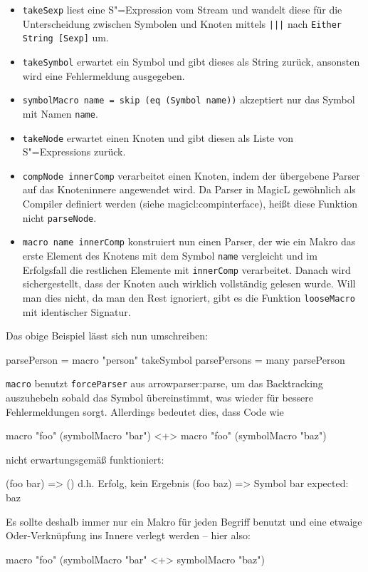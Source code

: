 \documentclass[12pt, a4paper, bibgerm]{scrbook}
\newenvironment{DIFnomarkup}{}{}
\newcommand\icode[1]{\lstinline?#1?}
\newcommand\sref{}
\newcommand{\sexp}{S"=Expression}
\newcommand{\sexps}{S"=Expressions}
\begin{document}
\begin{itemize}
\item \icode{takeSexp} liest eine \sexp{} vom Stream und wandelt diese
  für die Unterscheidung zwischen Symbolen und Knoten mittels
  \icode{|||} nach \icode{Either String [Sexp]} um.
\item \icode{takeSymbol} erwartet ein Symbol und gibt dieses als String
  zurück, ansonsten wird eine Fehlermeldung ausgegeben.
\item \icode{symbolMacro name = skip (eq (Symbol name))} akzeptiert nur
  das Symbol mit Namen \icode{name}.
\item \icode{takeNode} erwartet einen Knoten und gibt diesen als Liste
  von \sexps{} zurück.
\item \icode{compNode innerComp} verarbeitet einen Knoten, indem der
  übergebene Parser auf das Knoteninnere angewendet
  wird. Da Parser in MagicL gewöhnlich als Compiler definiert werden (siehe
  \sref{magicl:compinterface}), heißt diese Funktion nicht
  \icode{parseNode}.
\item \icode{macro name innerComp} %
  konstruiert nun einen Parser, der wie ein Makro das erste Element des
  Knotens mit dem Symbol \icode{name} vergleicht und im Erfolgsfall die
  restlichen Elemente mit \icode{innerComp} verarbeitet. Danach wird
  sichergestellt, dass der Knoten auch wirklich vollständig gelesen
  wurde. Will man dies nicht, da man den Rest ignoriert, gibt es die
  Funktion \icode{looseMacro} mit identischer Signatur.
\end{itemize}
Das obige Beispiel lässt sich nun umschreiben:
\begin{DIFnomarkup}\begin{code}
parsePerson  = macro "person" takeSymbol
parsePersons = many parsePerson
\end{code}\end{DIFnomarkup}

\icode{macro} benutzt \icode{forceParser} aus
\sref{arrowparser:parse}, um das Backtracking auszuhebeln sobald das
Symbol übereinstimmt, was wieder für bessere Fehlermeldungen
sorgt. Allerdings bedeutet dies, dass Code wie
\begin{DIFnomarkup}\begin{code}
macro "foo" (symbolMacro "bar") <+> macro "foo" (symbolMacro "baz")
\end{code}\end{DIFnomarkup}
nicht erwartungsgemäß funktioniert:
\begin{DIFnomarkup}\begin{code}
(foo bar)   => ()  d.h. Erfolg, kein Ergebnis
(foo baz)   => Symbol bar expected: baz
\end{code}\end{DIFnomarkup}
Es sollte deshalb immer nur ein Makro für jeden Begriff benutzt und
eine etwaige Oder-Verknüpfung ins Innere verlegt werden -- hier also:
\begin{DIFnomarkup}\begin{code}
macro "foo" (symbolMacro "bar" <+> symbolMacro "baz")
\end{code}\end{DIFnomarkup}
\end{document}
